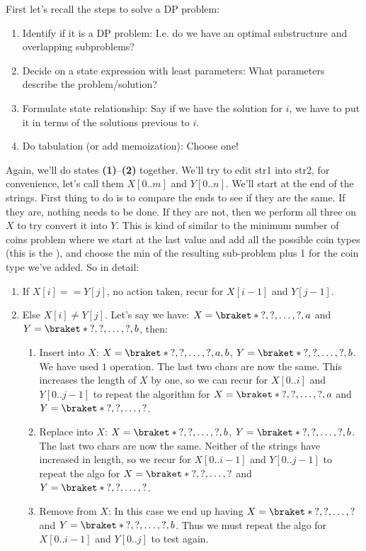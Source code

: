 \textbf{}

\RayNotesBegin

First let's recall the steps to solve a DP problem:
\begin{enumerate}[label=\textbf{\arabic*.}]
\item Identify if it is a DP problem: I.e. do we have an optimal
  substructure and overlapping subproblems?
\item Decide on a state expression with least parameters: What parameters
  describe the problem/solution?
\item Formulate state relationship: Say if we have the solution for $i$, we
  have to put it in terms of the solutions previous to $i$.
\item Do tabulation (or add memoization): Choose one!
\end{enumerate}

Again, we'll do states \textbf{(1)}--\textbf{(2)} together. We'll try to
edit str1 into str2, for convenience, let's call them $X[0..m]$ and
$Y[0..n]$. We'll start at the end of the strings. First thing to do is to
compare the ends to see if they are the same. If they are, nothing needs to
be done. If they are not, then we perform all three  on $X$ to
try convert it into $Y$. This is kind of similar to the minimum number of
coins problem where we start at the last value and add all the possible coin
types (this is the ), and choose the min of the resulting
sub-problem plus 1 for the coin type we've added. So in detail:
\begin{enumerate}[label=\textbf{\arabic*.}]
\item If $X[i]==Y[j]$, no action taken, recur for $X[i-1]$ and $Y[j-1]$.
\item Else $X[i]\neq Y[j]$. Let's say we have: $X=\braket*{?,?,\ldots,?,a}$
  and $Y=\braket*{?,?,\ldots,?,b}$, then:
  \begin{enumerate}[label=\textbf{\alph*.}]
  \item Insert into $X$: $X=\braket*{?,?,\ldots,?,a,b}$,
    $Y=\braket*{?,?,\ldots,?,b}$. We have used $1$ operation. The last two
    chars are now the same. This increases the length of $X$ by one, so we 
    can recur for $X[0..i]$ and $Y[0..j-1]$ to repeat the algorithm for 
    $X=\braket*{?,?,\ldots,?,a}$ and $Y=\braket*{?,?,\ldots,?}$.
  \item Replace into $X$: $X=\braket*{?,?,\ldots,?,b}$, 
    $Y=\braket*{?,?,\ldots,?,b}$. The last two chars are now the same.
    Neither of the strings have increased in length, so we recur for
    $X[0..i-1]$ and $Y[0..j-1]$ to repeat the algo for 
    $X=\braket*{?,?,\ldots,?}$ and $Y=\braket*{?,?,\ldots,?}$.
  \item Remove from $X$: In this case we end up having $X=\braket*{?,?,\ldots,?}$
  and $Y=\braket*{?,?,\ldots,?,b}$. Thus we must repeat the algo for
  $X[0..i-1]$ and $Y[0..j]$ to test again.
  \end{enumerate}
\end{enumerate}

